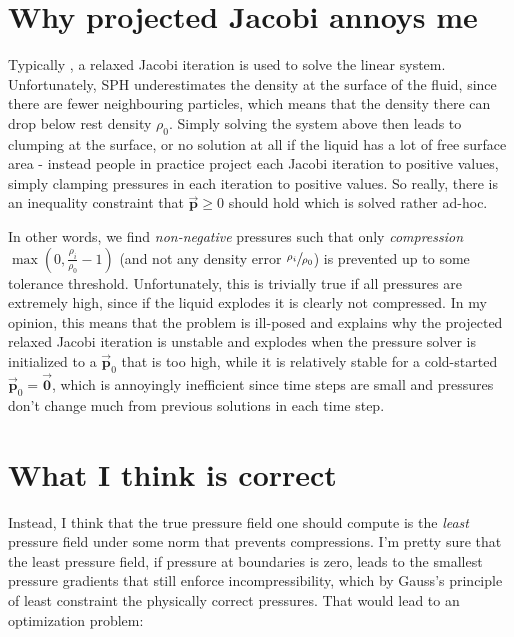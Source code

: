 \documentclass[oneside, a4paper]{book}
\newcommand\vek[1]{\vec{\bm{#1}}}
\newcommand\br[1]{\left(#1\right)}
\begin{document}
\section*{Why projected Jacobi annoys me}
Typically \autocite{iisph}, a relaxed Jacobi iteration is used to solve the linear system. Unfortunately, SPH underestimates the density at the surface of the fluid, since there are fewer neighbouring particles, which means that the density there can drop below rest density $\rho_0$. Simply solving the system above then leads to clumping at the surface, or no solution at all if the liquid has a lot of free surface area - instead people in practice project each Jacobi iteration to positive values, simply clamping pressures in each iteration to positive values. So really, there is an inequality constraint that $\vek{p}\geq 0$ should hold which is solved rather ad-hoc. 

In other words, we find \textit{non-negative} pressures such that only \textit{compression} $\max\br{0, \frac{\rho_i}{\rho_0}-1}$ (and not any density error $\sfrac{\rho_i}{\rho_0}$) is prevented up to some tolerance threshold. Unfortunately, this is trivially true if all pressures are extremely high, since if the liquid explodes it is clearly not compressed. In my opinion, this means that the problem is ill-posed and explains why the projected relaxed Jacobi iteration is unstable and explodes when the pressure solver is initialized to a $\vek{p}_0$ that is too high, while it is relatively stable for a cold-started $\vek{p}_0=\vek{0}$, which is annoyingly inefficient since time steps are small and pressures don't change much from previous solutions in each time step.\\

\section*{What I think is correct}
Instead, I think that the true pressure field one should compute is the \textit{least} pressure field under some norm that prevents compressions. I'm pretty sure that the least pressure field, if pressure at boundaries is zero, leads to the smallest pressure gradients that still enforce incompressibility, which by Gauss's principle of least constraint  \autocite[can be shown to yield]{least-pressure} the physically correct pressures. That would lead to an optimization problem:
\end{document}
